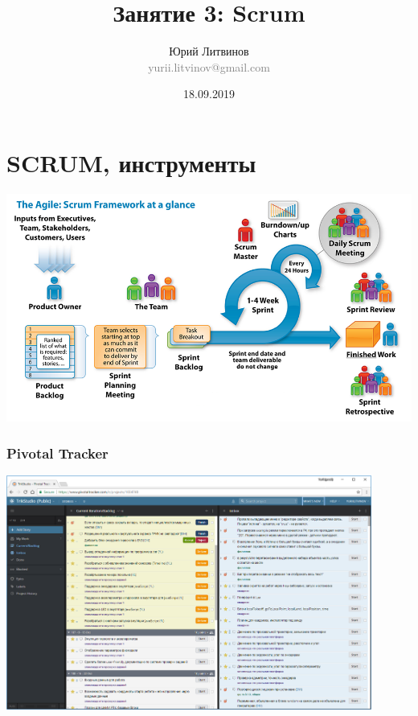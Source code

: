 \documentclass[xetex,mathserif,serif]{beamer}
\title{Занятие 3: Scrum}
\author[Юрий Литвинов]{Юрий Литвинов\\\small{\textcolor{gray}{yurii.litvinov@gmail.com}}}
\date{18.09.2019}
\begin{document}
	\frame{\titlepage}

	\section{SCRUM, инструменты}

	\begin{frame}
		\begin{center}
			\includegraphics[width=\textwidth]{scrum.png}
		\end{center}
	\end{frame}

	\begin{frame}
		\frametitle{Pivotal Tracker}
		\begin{center}
			\includegraphics[width=0.9\textwidth]{pivotalTracker.png}
		\end{center}
	\end{frame}
\end{document}
